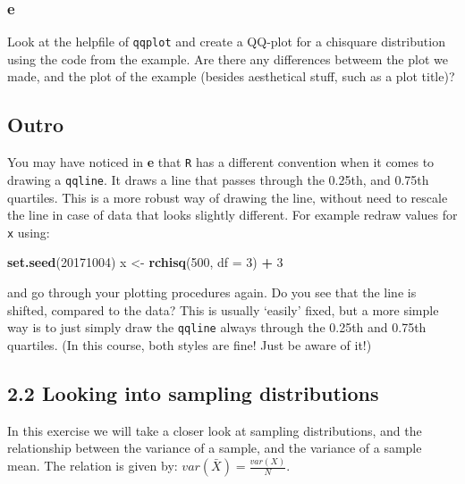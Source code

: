 \documentclass[]{article}
\newenvironment{Shaded}{\begin{snugshade}}{\end{snugshade}}
\newcommand{\DataTypeTok}[1]{\textcolor[rgb]{0.13,0.29,0.53}{#1}}
\newcommand{\DecValTok}[1]{\textcolor[rgb]{0.00,0.00,0.81}{#1}}
\newcommand{\KeywordTok}[1]{\textcolor[rgb]{0.13,0.29,0.53}{\textbf{#1}}}
\newcommand{\NormalTok}[1]{#1}
\newcommand{\OperatorTok}[1]{\textcolor[rgb]{0.81,0.36,0.00}{\textbf{#1}}}
\newcommand{\StringTok}[1]{\textcolor[rgb]{0.31,0.60,0.02}{#1}}
\begin{document}
\hypertarget{e-2}{%
\subsubsection{e}\label{e-2}}

Look at the helpfile of \texttt{qqplot} and create a QQ-plot for a
chisquare distribution using the code from the example. Are there any
differences betweem the plot we made, and the plot of the example
(besides aesthetical stuff, such as a plot title)?

\hypertarget{outro}{%
\subsection{Outro}\label{outro}}

You may have noticed in \textbf{e} that \texttt{R} has a different
convention when it comes to drawing a \texttt{qqline}. It draws a line
that passes through the 0.25th, and 0.75th quartiles. This is a more
robust way of drawing the line, without need to rescale the line in case
of data that looks slightly different. For example redraw values for
\texttt{x} using:

\begin{Shaded}
\begin{Highlighting}[]
\KeywordTok{set.seed}\NormalTok{(}\DecValTok{20171004}\NormalTok{)}
\NormalTok{x <-}\StringTok{ }\KeywordTok{rchisq}\NormalTok{(}\DecValTok{500}\NormalTok{, }\DataTypeTok{df =} \DecValTok{3}\NormalTok{) }\OperatorTok{+}\StringTok{ }\DecValTok{3}
\end{Highlighting}
\end{Shaded}

and go through your plotting procedures again. Do you see that the line
is shifted, compared to the data? This is usually `easily' fixed, but a
more simple way is to just simply draw the \texttt{qqline} always
through the 0.25th and 0.75th quartiles. (In this course, both styles
are fine! Just be aware of it!)

\hypertarget{looking-into-sampling-distributions}{%
\subsection{2.2 Looking into sampling
distributions}\label{looking-into-sampling-distributions}}

In this exercise we will take a closer look at sampling distributions,
and the relationship between the variance of a sample, and the variance
of a sample mean. The relation is given by:
\(var(\bar{X}) = \frac{var(X)}{N}\).
\end{document}
